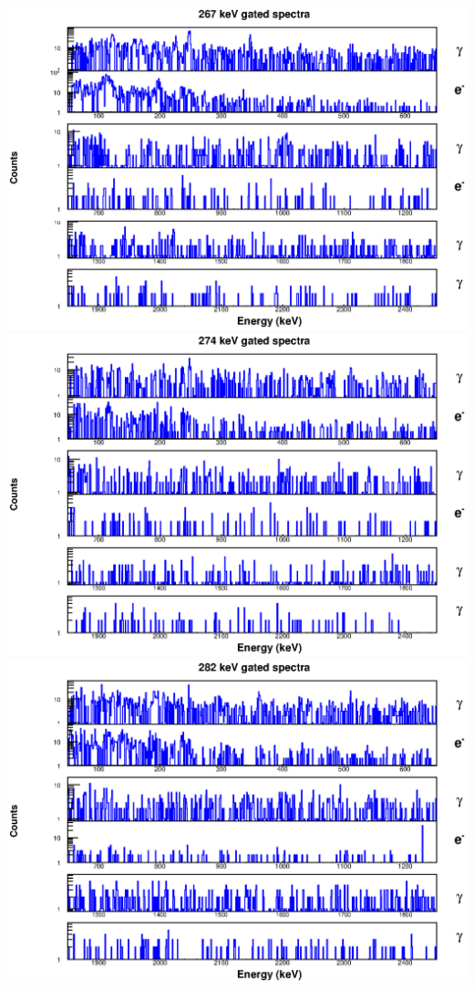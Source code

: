 \includegraphics[scale=0.8]{154Gd_Appendix/267_combined.eps}
\includegraphics[scale=0.8]{154Gd_Appendix/274_combined.eps}
\includegraphics[scale=0.8]{154Gd_Appendix/282_combined.eps}
